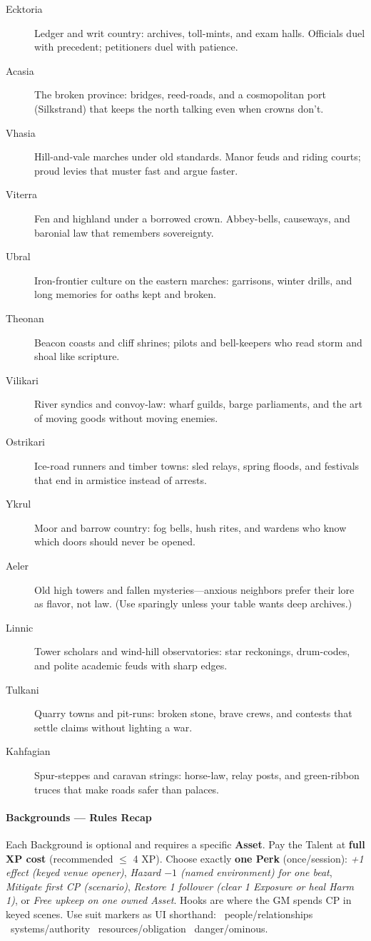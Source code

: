 \documentclass[11pt]{article}
\begin{document}
\begin{description}
  \item[Ecktoria] Ledger and writ country: archives, toll-mints, and exam halls. Officials duel with precedent; petitioners duel with patience.
  \item[Acasia] The broken province: bridges, reed-roads, and a cosmopolitan port (Silkstrand) that keeps the north talking even when crowns don’t.
  \item[Vhasia] Hill-and-vale marches under old standards. Manor feuds and riding courts; proud levies that muster fast and argue faster.
  \item[Viterra] Fen and highland under a borrowed crown. Abbey-bells, causeways, and baronial law that remembers sovereignty.
  \item[Ubral] Iron-frontier culture on the eastern marches: garrisons, winter drills, and long memories for oaths kept and broken.
  \item[Theonan] Beacon coasts and cliff shrines; pilots and bell-keepers who read storm and shoal like scripture.
  \item[Vilikari] River syndics and convoy-law: wharf guilds, barge parliaments, and the art of moving goods without moving enemies.
  \item[Ostrikari] Ice-road runners and timber towns: sled relays, spring floods, and festivals that end in armistice instead of arrests.
  \item[Ykrul] Moor and barrow country: fog bells, hush rites, and wardens who know which doors should never be opened.
  \item[Aeler] Old high towers and fallen mysteries—anxious neighbors prefer their lore as flavor, not law. (Use sparingly unless your table wants deep archives.)
  \item[Linnic] Tower scholars and wind-hill observatories: star reckonings, drum-codes, and polite academic feuds with sharp edges.
  \item[Tulkani] Quarry towns and pit-runs: broken stone, brave crews, and contests that settle claims without lighting a war.
  \item[Kahfagian] Spur-steppes and caravan strings: horse-law, relay posts, and green-ribbon truces that make roads safer than palaces.
\end{description}

\paragraph{Backgrounds — Rules Recap}
Each Background is optional and requires a specific \textbf{Asset}. Pay the Talent at \textbf{full XP cost} (recommended $\leq$ 4 XP). Choose exactly \textbf{one Perk} (once/session): \emph{+1 effect (keyed venue opener)}, \emph{Hazard $-1$ (named environment) for one beat}, \emph{Mitigate first CP (scenario)}, \emph{Restore 1 follower (clear 1 Exposure or heal Harm 1)}, or \emph{Free upkeep on one owned Asset}. Hooks are where the GM spends CP in keyed scenes. Use suit markers as UI shorthand: \heartsuit~people/relationships \quad \clubsuit~systems/authority \quad \diamondsuit~resources/obligation \quad \spadesuit~danger/ominous.
\end{document}
